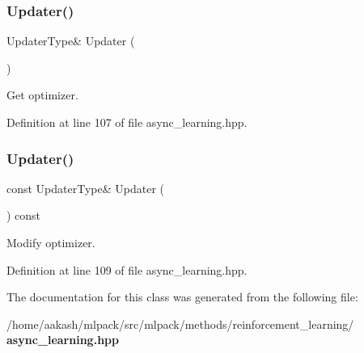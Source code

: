\subsubsection{Updater()\hspace{0.1cm}{\footnotesize\ttfamily [1/2]}}
{\footnotesize\ttfamily Updater\+Type\& Updater (\begin{DoxyParamCaption}{ }\end{DoxyParamCaption})\hspace{0.3cm}{\ttfamily [inline]}}



Get optimizer. 



Definition at line 107 of file async\+\_\+learning.\+hpp.

\mbox{\label{classmlpack_1_1rl_1_1AsyncLearning_af345bba27115c3d09fa7b06fc1c984a4}} 
\subsubsection{Updater()\hspace{0.1cm}{\footnotesize\ttfamily [2/2]}}
{\footnotesize\ttfamily const Updater\+Type\& Updater (\begin{DoxyParamCaption}{ }\end{DoxyParamCaption}) const\hspace{0.3cm}{\ttfamily [inline]}}



Modify optimizer. 



Definition at line 109 of file async\+\_\+learning.\+hpp.



The documentation for this class was generated from the following file\+:\begin{DoxyCompactItemize}
\item 
/home/aakash/mlpack/src/mlpack/methods/reinforcement\+\_\+learning/\textbf{ async\+\_\+learning.\+hpp}\end{DoxyCompactItemize}
